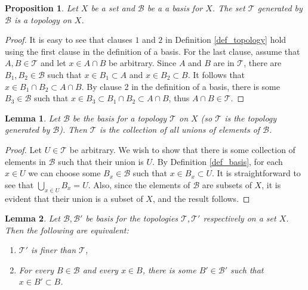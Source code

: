 \documentclass{article}
\newtheorem{lemma}{Lemma}[subsection]
\newtheorem{proposition}{Proposition}[subsection]
\theoremstyle{definition}
\theoremstyle{remark}
\newcommand{\prt}[1]{\mathcal{#1}}
\begin{document}
\begin{proposition}
    Let $X$ be a set and $\prt{B}$ be a a basis for $X$. The set $\prt{T}$ generated by $\prt{B}$ is a topology on $X$.
\end{proposition}

\begin{proof}
    It is easy to see that clauses $1$ and $2$ in Definition \ref{def_topology} hold using the first clause in the definition of a basis. For the last clause, assume that $A,B \in \prt{T}$ and let $x \in A \cap B$ be arbitrary. Since $A$ and $B$ are in $\prt{T}$, there are $B_1, B_2 \in \prt{B}$ such that $x \in B_1 \subset A$ and $x \in B_2 \subset B$. It follows that $x \in B_1 \cap B_2 \subset A \cap B$. By clause 2 in the definition of a basis, there is some $B_3 \in \prt{B}$ such that $x \in B_3 \subset B_1 \cap B_2 \subset A \cap B$, thus $A \cap B \in \prt{T}$.
\end{proof}

\newpage
\begin{lemma} \label{lemma_basis_makes_topology}
    Let $\prt{B}$ be the basis for a topology $\prt{T}$ on $X$ (so $\prt{T}$ is the topology generated by $\prt{B}$). Then $\prt{T}$ is the collection of all unions of elements of $\prt{B}$.
\end{lemma}

\begin{proof}
    Let $U \in \prt{T}$ be arbitrary. We wish to show that there is some collection of elements in $\prt{B}$ such that their union is $U$. By Definition \ref{def_basis}, for each $x \in U$ we can choose some $B_x \in \prt{B}$ such that $x \in B_x \subset U$. It is straightforward to see that $\bigcup_{x \in U} B_x = U$. Also, since the elements of $\prt{B}$ are subsets of $X$, it is evident that their union is a subset of $X$, and the result follows.
\end{proof}

\begin{lemma} \label{lemma_finer_by_basis}
    Let $\prt{B}, \prt{B'}$ be basis for the topologies $\prt{T}, \prt{T'}$ respectively on a set $X$. Then the following are equivalent:
    
    \begin{enumerate}
        \item $\prt{T'}$ is finer than $\prt{T}$,
        \item For every $B \in \prt{B}$ and every $x \in B$, there is some $B' \in \prt{B'}$ such that $x \in B' \subset B$.
    \end{enumerate}
\end{lemma}
\end{document}
